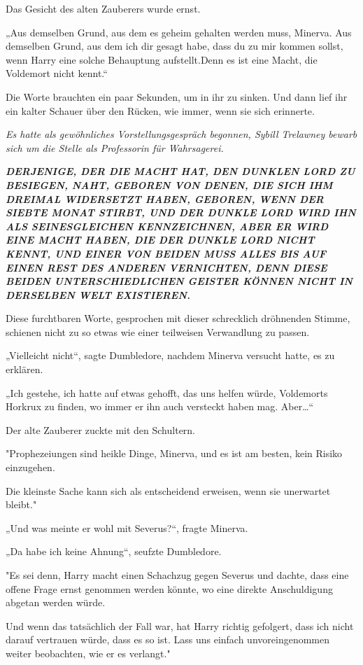 {Das Gesicht des alten Zauberers wurde ernst.

„Aus demselben Grund, aus dem es geheim gehalten werden muss, Minerva. Aus demselben Grund, aus dem ich dir gesagt habe, dass du zu mir kommen sollst, wenn Harry eine solche Behauptung aufstellt.Denn es ist eine Macht, die Voldemort nicht kennt.“

Die Worte brauchten ein paar Sekunden, um in ihr zu sinken. Und dann lief ihr ein kalter Schauer über den Rücken, wie immer, wenn sie sich erinnerte.

\emph{Es hatte als gewöhnliches Vorstellungsgespräch begonnen, Sybill Trelawney bewarb sich um die Stelle als Professorin für Wahrsagerei.}

\emph{\hfill\break }\textbf{\emph{DERJENIGE, DER DIE MACHT HAT, DEN DUNKLEN LORD ZU BESIEGEN, NAHT, GEBOREN VON DENEN, DIE SICH IHM DREIMAL WIDERSETZT HABEN, GEBOREN, WENN DER SIEBTE MONAT STIRBT, UND DER DUNKLE LORD WIRD IHN ALS SEINESGLEICHEN KENNZEICHNEN, ABER ER WIRD EINE MACHT HABEN, DIE DER DUNKLE LORD NICHT KENNT, UND EINER VON BEIDEN MUSS ALLES BIS AUF EINEN REST DES ANDEREN VERNICHTEN, DENN DIESE BEIDEN UNTERSCHIEDLICHEN GEISTER KÖNNEN NICHT IN DERSELBEN WELT EXISTIEREN.}}

Diese furchtbaren Worte, gesprochen mit dieser schrecklich dröhnenden Stimme, schienen nicht zu so etwas wie einer teilweisen Verwandlung zu passen.

„Vielleicht nicht“, sagte Dumbledore, nachdem Minerva versucht hatte, es zu erklären.

„Ich gestehe, ich hatte auf etwas gehofft, das uns helfen würde, Voldemorts Horkrux zu finden, wo immer er ihn auch versteckt haben mag. Aber…“

Der alte Zauberer zuckte mit den Schultern.

"Prophezeiungen sind heikle Dinge, Minerva, und es ist am besten, kein Risiko einzugehen.

Die kleinste Sache kann sich als entscheidend erweisen, wenn sie unerwartet bleibt."

„Und was meinte er wohl mit Severus?“, fragte Minerva.

„Da habe ich keine Ahnung“, seufzte Dumbledore.

"Es sei denn, Harry macht einen Schachzug gegen Severus und dachte, dass eine offene Frage ernst genommen werden könnte, wo eine direkte Anschuldigung abgetan werden würde.

Und wenn das tatsächlich der Fall war, hat Harry richtig gefolgert, dass ich nicht darauf vertrauen würde, dass es so ist. Lass uns einfach unvoreingenommen weiter beobachten, wie er es verlangt."

}

